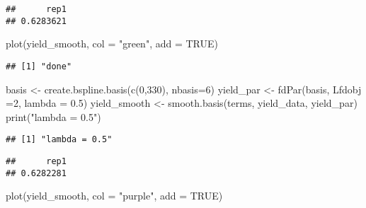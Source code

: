 \documentclass[
]{article}
\newenvironment{Shaded}{\begin{snugshade}}{\end{snugshade}}
\newcommand{\AttributeTok}[1]{\textcolor[rgb]{0.77,0.63,0.00}{#1}}
\newcommand{\ConstantTok}[1]{\textcolor[rgb]{0.00,0.00,0.00}{#1}}
\newcommand{\DecValTok}[1]{\textcolor[rgb]{0.00,0.00,0.81}{#1}}
\newcommand{\FloatTok}[1]{\textcolor[rgb]{0.00,0.00,0.81}{#1}}
\newcommand{\FunctionTok}[1]{\textcolor[rgb]{0.00,0.00,0.00}{#1}}
\newcommand{\NormalTok}[1]{#1}
\newcommand{\OtherTok}[1]{\textcolor[rgb]{0.56,0.35,0.01}{#1}}
\newcommand{\SpecialCharTok}[1]{\textcolor[rgb]{0.00,0.00,0.00}{#1}}
\newcommand{\StringTok}[1]{\textcolor[rgb]{0.31,0.60,0.02}{#1}}
\begin{document}
\begin{verbatim}
##      rep1 
## 0.6283621
\end{verbatim}

\begin{Shaded}
\begin{Highlighting}[]
\FunctionTok{plot}\NormalTok{(yield\_smooth, }\AttributeTok{col =} \StringTok{"green"}\NormalTok{, }\AttributeTok{add =} \ConstantTok{TRUE}\NormalTok{)}
\end{Highlighting}
\end{Shaded}

\begin{verbatim}
## [1] "done"
\end{verbatim}

\begin{Shaded}
\begin{Highlighting}[]
\NormalTok{basis }\OtherTok{\textless{}{-}} \FunctionTok{create.bspline.basis}\NormalTok{(}\FunctionTok{c}\NormalTok{(}\DecValTok{0}\NormalTok{,}\DecValTok{330}\NormalTok{), }\AttributeTok{nbasis=}\DecValTok{6}\NormalTok{)}
\NormalTok{yield\_par }\OtherTok{\textless{}{-}} \FunctionTok{fdPar}\NormalTok{(basis, }\AttributeTok{Lfdobj =}\DecValTok{2}\NormalTok{, }\AttributeTok{lambda =} \FloatTok{0.5}\NormalTok{)}
\NormalTok{yield\_smooth }\OtherTok{\textless{}{-}} \FunctionTok{smooth.basis}\NormalTok{(terms, yield\_data, yield\_par)}
\FunctionTok{print}\NormalTok{(}\StringTok{"lambda = 0.5"}\NormalTok{)}
\end{Highlighting}
\end{Shaded}

\begin{verbatim}
## [1] "lambda = 0.5"
\end{verbatim}

\begin{Shaded}
\end{Shaded}

\begin{verbatim}
##      rep1 
## 0.6282281
\end{verbatim}

\begin{Shaded}
\begin{Highlighting}[]
\FunctionTok{plot}\NormalTok{(yield\_smooth, }\AttributeTok{col =} \StringTok{"purple"}\NormalTok{, }\AttributeTok{add =} \ConstantTok{TRUE}\NormalTok{)}
\end{Highlighting}
\end{Shaded}
\end{document}
